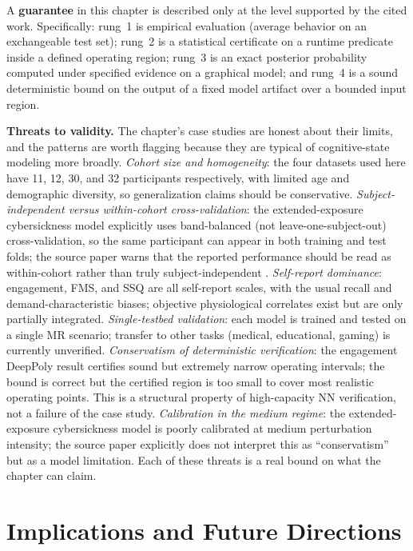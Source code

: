 \documentclass[graybox]{svmult}
\begin{document}
\begin{definition}
A \textbf{guarantee} in this chapter is described only at the level supported by the cited work. Specifically: rung~1 is empirical evaluation (average behavior on an exchangeable test set); rung~2 is a statistical certificate on a runtime predicate inside a defined operating region; rung~3 is an exact posterior probability computed under specified evidence on a graphical model; and rung~4 is a sound deterministic bound on the output of a fixed model artifact over a bounded input region.
\end{definition}

\textbf{Threats to validity.} The chapter's case studies are honest about their limits, and the patterns are worth flagging because they are typical of cognitive-state modeling more broadly. \emph{Cohort size and homogeneity}: the four datasets used here have 11, 12, 30, and 32 participants respectively, with limited age and demographic diversity, so generalization claims should be conservative. \emph{Subject-independent versus within-cohort cross-validation}: the extended-exposure cybersickness model explicitly uses band-balanced (not leave-one-subject-out) cross-validation, so the same participant can appear in both training and test folds; the source paper warns that the reported performance should be read as within-cohort rather than truly subject-independent \citep{cybersickness2025extended}. \emph{Self-report dominance}: engagement, FMS, and SSQ are all self-report scales, with the usual recall and demand-characteristic biases; objective physiological correlates exist but are only partially integrated. \emph{Single-testbed validation}: each model is trained and tested on a single MR scenario; transfer to other tasks (medical, educational, gaming) is currently unverified. \emph{Conservatism of deterministic verification}: the engagement DeepPoly result certifies sound but extremely narrow operating intervals; the bound is correct but the certified region is too small to cover most realistic operating points. This is a structural property of high-capacity NN verification, not a failure of the case study. \emph{Calibration in the medium regime}: the extended-exposure cybersickness model is poorly calibrated at medium perturbation intensity; the source paper explicitly does not interpret this as ``conservatism'' but as a model limitation. Each of these threats is a real bound on what the chapter can claim.

\section{Implications and Future Directions}
\label{sec:implications}
\end{document}
